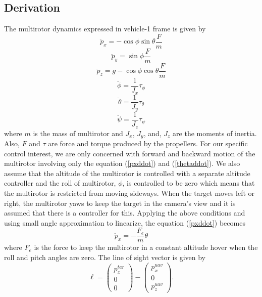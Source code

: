 \subsection{Derivation}
The multirotor dynamics expressed in vehicle-1 frame \cite{Beard2008} is given by 
\begin{equation}
\ddot{p}_x=-\cos\phi\sin\theta\frac{F}{m}
\label{pxddot}
\end{equation}
\begin{equation}
\ddot{p}_y=\sin\phi\frac{F}{m}
\end{equation}
\begin{equation}
\ddot{p}_z=g-\cos\phi\cos\theta\frac{F}{m}
\end{equation}
\begin{equation}
\ddot{\phi}=\frac{1}{J_x}\tau_{\phi}
\end{equation}
\begin{equation}
\ddot{\theta}=\frac{1}{J_y}\tau_{\theta}
\label{thetaddot}
\end{equation}
\begin{equation}
\ddot{\psi}=\frac{1}{J_z}\tau_{\psi}
\end{equation}
where $m$ is the mass of multirotor and $J_x$, $J_y$, and, $J_z$ are the moments of inertia. Also, $F$ and $\tau$ are force and torque produced by the propellers. For our specific control interest, we are only concerned with forward and backward motion of the multirotor involving only the equation (\ref{pxddot}) and (\ref{thetaddot}). We also assume that the altitude of the multirotor is controlled with a separate altitude controller and the roll of multirotor, $\phi$, is controlled to be zero which means that the multirotor is restricted from moving sideways. When the target moves left or right, the multirotor yaws to keep the target in the camera's view and it is assumed that there is a controller for this. Applying the above conditions and using small angle approximation to linearize, the equation (\ref{pxddot}) becomes 
\begin{equation}
\ddot{p}_x=-\frac{F_e}{m}\theta
\end{equation}
where $F_e$ is the force to keep the multirotor in a constant altitude hover when the roll and pitch angles are zero. The line of sight vector is given by 
\begin{equation}
\ell=\begin{pmatrix}
p_x^{tar} \\ 0 \\ 0
\end{pmatrix}
-\begin{pmatrix}
p_x^{uav} \\ 0 \\ p_z^{uav}
\end{pmatrix}.
\label{l}
\end{equation}
